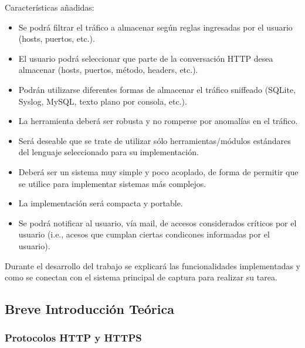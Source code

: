 Características añadidas:
\begin{itemize}
	\item Se podrá filtrar el tráfico a almacenar según reglas ingresadas por el usuario (hosts, puertos, etc.).
	\item El usuario podrá seleccionar que parte de la conversación HTTP desea almacenar (hosts, puertos, método, headers, etc.).
	\item Podrán utilizarse diferentes formas de almacenar el tráfico sniffeado (SQLite, Syslog, MySQL, texto plano por consola, etc.).
	\item La herramienta deberá ser robusta y no romperse por anomalías en el tráfico.
	\item Será deseable que se trate de utilizar sólo herramientas/módulos estándares del lenguaje seleccionado para su implementación.
	\item Deberá ser un sistema muy simple y poco acoplado, de forma de permitir que se utilice para implementar sistemas más complejos.
	\item La implementación será compacta y portable.
	\item Se podrá notificar al usuario, vía mail, de accesos considerados críticos por el usuario (i.e., acesos que cumplan ciertas condicones informadas por el usuario).
\end{itemize}

Durante el desarrollo del trabajo se explicará las funcionalidades implementadas y como se conectan con el sistema principal de captura para realizar su tarea.

\subsection{Breve Introducción Teórica}

\subsubsection{Protocolos HTTP y HTTPS}

